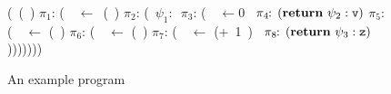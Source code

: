 \begin{figure}[t!]
\renewcommand{\arraystretch}{.8}
\begin{uprogram}
  \UFL(\DEFINE\ (\length~\xl)
    $\pi_1\!\!:\, $(\LET\ \px\ $\leftarrow $\ (\NULLQ~\xl) \IN
   \hspace*{.05cm} $\pi_2\!\!:\,$(\SIF\
  $\psi_1\!\!:\,$ \px
   \hspace*{.27cm} $\pi_3\!\!:\,
  $(\LET\ \pv\ $\leftarrow 0$\ \IN \hspace*{1.4mm}
   \hspace*{.27cm}  $\pi_4\!\!:\,(\mbox{$\mathbf{ return}$}~\psi_2:\mbox{\tt v})$
   \hspace*{.29cm}    $\pi_5\!\!:\, $(\LET~\pu\
  $\leftarrow$  (\CDR~\xl)  \IN
  \UNL{4} \hspace*{.34cm}   $\pi_6\!\!:\, $(\LET~\py\
  $\leftarrow$  (\length~\pu)  \IN
  \UNL{5} \hspace*{.34cm} $\pi_7\!\!:\,
  $(\LET~\pz\ $\leftarrow$ (+~1~\py)\ \IN 
  \UNL{6} \hspace*{.34cm} $\pi_8\!\!:\,
  (\mbox{$\mathbf{ return}$}~\psi_3:\mbox{\tt z})$)))))))
\end{uprogram}
\caption{An example program}\label{fig:mot-example2-a}
\vspace*{-5mm}
\end{figure}

